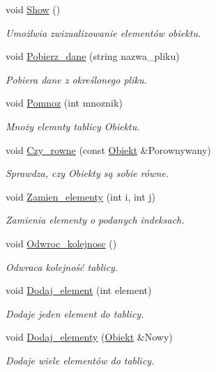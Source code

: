 \begin{DoxyCompactItemize}
void \hyperlink{class_obiekt_a59b1b7dcf398424366b132d5ae7ac087}{\-Show} ()
\begin{DoxyCompactList}\small\item\em \-Umożlwia zwizualizowanie elementów obiektu. \end{DoxyCompactList}\item 
void \hyperlink{class_obiekt_a481091a905fc01050b9bf782502efabb}{\-Pobierz\-\_\-dane} (string nazwa\-\_\-pliku)
\begin{DoxyCompactList}\small\item\em \-Pobiera dane z określonego pliku. \end{DoxyCompactList}\item 
void \hyperlink{class_obiekt_aae43ab1926c5c6ccd82d0908c33474da}{\-Pomnoz} (int mnoznik)
\begin{DoxyCompactList}\small\item\em \-Mnoży elemnty tablicy \-Obiektu. \end{DoxyCompactList}\item 
void \hyperlink{class_obiekt_a3e8670b709172fc0a63df917f41c98cf}{\-Czy\-\_\-rowne} (const \hyperlink{class_obiekt}{\-Obiekt} \&\-Porownywany)
\begin{DoxyCompactList}\small\item\em \-Sprawdza, czy \-Obiekty są sobie równe. \end{DoxyCompactList}\item 
void \hyperlink{class_obiekt_a46517777b9e80cc1ddc434d67922fe9a}{\-Zamien\-\_\-elementy} (int i, int j)
\begin{DoxyCompactList}\small\item\em \-Zamienia elementy o podanych indeksach. \end{DoxyCompactList}\item 
void \hyperlink{class_obiekt_a28ec1565e960673b6f762c3488aa7ca6}{\-Odwroc\-\_\-kolejnosc} ()
\begin{DoxyCompactList}\small\item\em \-Odwraca kolejność tablicy. \end{DoxyCompactList}\item 
void \hyperlink{class_obiekt_ac0f67824826a384077bc30e51552a9a7}{\-Dodaj\-\_\-element} (int element)
\begin{DoxyCompactList}\small\item\em \-Dodaje jeden element do tablicy. \end{DoxyCompactList}\item 
void \hyperlink{class_obiekt_ae70037bf4b1f582c7a1e09c16314ac83}{\-Dodaj\-\_\-elementy} (\hyperlink{class_obiekt}{\-Obiekt} \&\-Nowy)
\begin{DoxyCompactList}\small\item\em \-Dodaje wiele elementów do tablicy. \end{DoxyCompactList}\end{DoxyCompactItemize}
